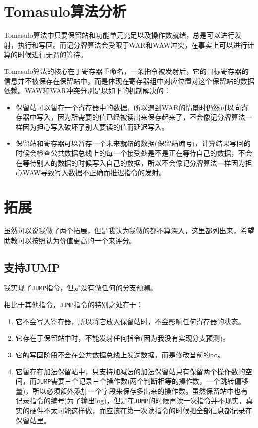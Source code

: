 \documentclass[12pt, UTF8]{article}
\begin{document}
\section{Tomasulo算法分析}

Tomasulo算法中只要保留站和功能单元充足以及操作数就绪，总是可以进行发射，执行和写回。而记分牌算法会受限于WAR和WAW冲突，在事实上可以进行计算的时候进行无谓的等待。

Tomasulo算法的核心在于寄存器重命名，一条指令被发射后，它的目标寄存器的信息并不被保存在保留站中，而是体现在寄存器组中对应位置对这个保留站的数据依赖。WAW和WAR冲突分别是以如下的机制解决的：

\begin{itemize}
  \item 保留站可以暂存一个寄存器中的数据，所以遇到WAR的情景时仍然可以向寄存器中写入，因为所需要的值已经被读出来保存起来了，不会像记分牌算法一样因为担心写入破坏了别人要读的值而延迟写入。
  \item 保留站和寄存器可以暂存一个未来就绪的数据(保留站编号)，计算结果写回的时候会检查公共数据总线上的每一个接受处是不是正在等待自己的数据，不会在等待别人的数据的时候写入自己的数据，所以不会像记分牌算法一样因为担心WAW导致写入数据不正确而推迟指令的发射。
\end{itemize}

\section{拓展}

虽然可以说我做了两个拓展，但是我认为我做的都不算深入，这里都列出来，希望助教可以按照认为价值更高的一个来评分。

\subsection{支持JUMP}

我实现了\lstinline|JUMP|指令，但是没有做任何的分支预测。

相比于其他指令，\lstinline|JUMP|指令的特别之处在于：

\begin{enumerate}
  \item 它不会写入寄存器，所以将它放入保留站时，不会影响任何寄存器的状态。
  \item 它存在于保留站中时，不能发射任何指令(因为我没有实现分支预测)。
  \item 它的写回阶段不会在公共数据总线上发送数据，而是修改当前的\lstinline|pc|。
  \item 它暂存在加法保留站中，只支持加减法的加法保留站只有保留两个操作数的空间，而\lstinline|JUMP|需要三个记录三个操作数(两个判断相等的操作数，一个跳转偏移量)，所以必须额外添加一个字段来保存多出来的操作数。虽然保留站中也有记录指令的编号(为了输出log)，但是在\lstinline|JUMP|的时候再读一次指令并不现实，真实的硬件不太可能这样做，而应该在第一次读指令的时候把全部信息都记录在保留站里。
\end{enumerate}
\end{document}
